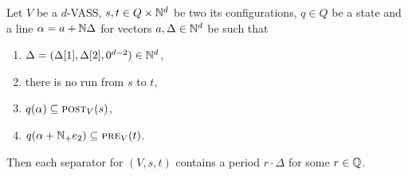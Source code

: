 \begin{theorem}\label{thm:simple}
Let $V$ be a $d$-VASS, $s, t \in Q \times \mathbb{N}^d$ be two its configurations, $q \in Q$ be a state
and a line $\alpha = a + \mathbb{N} \Delta$ for vectors $a, \Delta \in \mathbb{N}^d$ be such that
\begin{enumerate}[(1)]
  \item $\Delta = (\Delta[1], \Delta[2], 0^{d-2}) \in \mathbb{N}^d$,
  \item there is no run from $s$ to $t$,
  \item $q(\alpha) \subseteq \textsc{post}_V(s)$,
  \item $q(\alpha + \mathbb{N}_{+} e_2) \subseteq \textsc{pre}_V(t)$.
\end{enumerate}
Then each separator for $(V, s, t)$ contains a period $r \cdot \Delta$ for some $r \in \mathbb{Q}$.
\end{theorem}

